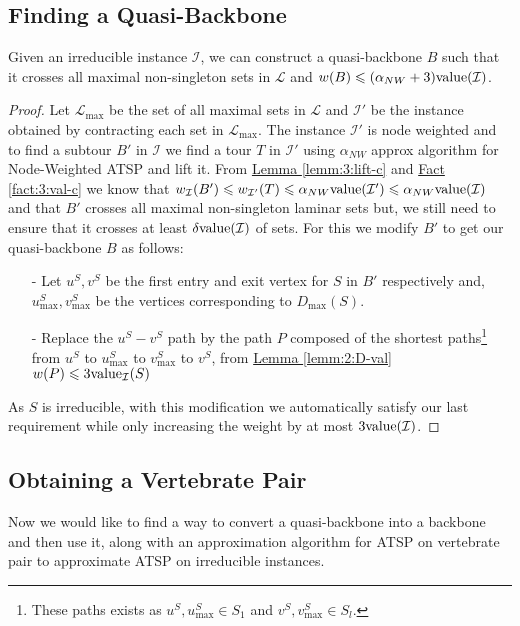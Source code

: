 \documentclass[./main.tex]{subfiles}
\newcommand{\calI}{\ensuremath{\mathcal{I}}}
\newcommand{\calL}{\ensuremath{\mathcal{L}}}
\begin{document}
	\subsection{Finding a Quasi-Backbone}
	\begin{lemma}\label{lemm:6:q-bb}
		Given an irreducible instance $\calI$, we can construct a quasi-backbone $B$ such that it crosses all maximal non-singleton sets in $\calL$ and $w(B) \leqslant (\alpha_{NW} + 3)\val(\calI)$.
	\end{lemma}
	\begin{proof}
		Let $\calL_{\max}$ be the set of all maximal sets in $\calL$ and $\calI'$ be the instance obtained by contracting each set in $\calL_{\max}$. The instance $\calI'$ is node weighted and to find a subtour $B'$ in $\calI$ we find a tour $T$ in $\calI'$ using $\alpha_{NW}$ approx algorithm for Node-Weighted ATSP and lift it. From \hyperref[lemm:3:lift-c]{Lemma \ref{lemm:3:lift-c}} and \hyperref[fact:3:val-c]{Fact \ref{fact:3:val-c}} we know that $w_\calI(B') \leqslant w_{\calI'}(T) \leqslant \alpha_{NW}\val(\calI') \leqslant \alpha_{NW}\val(\calI)$ and that $B'$ crosses all maximal non-singleton laminar sets but, we still need to ensure that it crosses at least $\delta\val(\calI)$ of sets. For this we modify $B'$ to get our quasi-backbone $B$ as follows:
		\begin{itemize}
			\item[-] Let $u^S, v^S$ be the first entry and exit vertex for $S$ in $B'$ respectively and, $u^S_{\max}, v^S_{\max}$ be the vertices corresponding to $D_{\max}(S)$.
			\item[-] Replace the $u^S - v^S$ path by the path $P$ composed of the shortest paths\footnote{These paths exists as $u^S, u^S_{\max} \in S_1$ and $v^S, v^S_{\max} \in S_l$.} from $u^S$ to $u^S_{\max}$ to $v^S_{\max}$ to $v^S$, from \hyperref[lemm:2:D-val]{Lemma \ref{lemm:2:D-val}} $w(P) \leqslant 3\val_{\calI}(S)$
		\end{itemize}
		As $S$ is irreducible, with this modification we automatically satisfy our last requirement while only increasing the weight by at most $3\val(\calI)$.
	\end{proof}
	
	\subsection{Obtaining a Vertebrate Pair}
	Now we would like to find a way to convert a quasi-backbone into a backbone and then use it, along with an approximation algorithm for ATSP on vertebrate pair to approximate ATSP  on irreducible instances.
	
\end{document}
